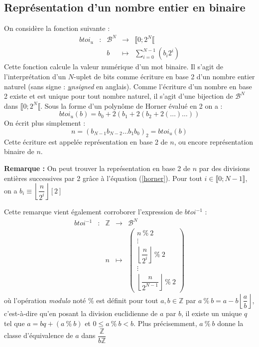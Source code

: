 \documentclass[../../main.tex]{subfiles}
\begin{document}
\subsection{Représentation d'un nombre entier en binaire}
On considère la fonction suivante :
$$
\begin{array}{lclcl}
btoi_{u} & : & \mathcal{B}^{N} & \rightarrow & \llbracket 0; 2^{N}\llbracket \\
     &   & b & \mapsto & \displaystyle\sum_{i = 0}^{N-1}(b_{i}2^{i})
\end{array}
$$
Cette fonction calcule la valeur numérique d'un mot binaire. Il s'agit de l'interprétation d'un $N$-uplet de bits comme écriture en base 2 d'un nombre entier naturel (sans signe : \textit{\underline{u}nsigned} en anglais). Comme l'écriture d'un nombre en base 2 existe et est unique pour tout nombre naturel, il s'agit d'une bijection de $\mathcal{B}^{N}$ dans $\llbracket 0; 2^{N}\llbracket $. \newline
Sous la forme d'un polynôme de Horner évalué en 2 on a :
\begin{equation}\label{horner}
btoi_{u}(b) = b_{0} + 2(b_{1} + 2(b_{2} + 2(\dots)\dots))
\end{equation}
On écrit plus simplement :
$$n = (b_{N-1}b_{N-2}\dots b_{1}b_{0})_{2} = btoi_{u}(b)$$
Cette écriture est appelée représentation en base 2 de $n$, ou encore représentation binaire de $n$.

\textbf{Remarque :} On peut trouver la représentation en base 2 de $n$ par des divisions entières successives par 2 grâce à l'équation (\ref{horner}). Pour tout $i\in{\llbracket{0; N-1}\rrbracket}$, on a $b_{i} \equiv{\left\lfloor{\dfrac{n}{2^{i}}}\right\rfloor{[2]}}$ 

Cette remarque vient également corroborer l'expression de $btoi^{-1}$ :
$$
\begin{array}{lclcl}
btoi^{-1} & : & \mathbb{Z} & \rightarrow & \mathcal{B}^{N} \\
     &   & n & \mapsto & \begin{pmatrix}
n\ \%\ 2 \\
\vdots \\
\left\lfloor\dfrac{n}{2^{i}}\right\rfloor\ \%\ 2 \\
\vdots \\
\left\lfloor\dfrac{n}{2^{N-1}}\right\rfloor\ \%\ 2
\end{pmatrix}
\end{array}
$$
où l'opération \textit{modulo} noté $\%$ est définit pour tout $a, b\in{\mathbb{Z}}$ par $a\ \%\ b = a - b\left\lfloor\dfrac{a}{b}\right\rfloor$, c'est-à-dire qu'en posant la division euclidienne de $a$ par $b$, il existe un unique $q$ tel que $a = bq + (a\ \%\ b)$ et $0 \leq a\ \%\ b < b$.\newline
Plus précisemment, $a\ \%\ b$ donne la classe d'équivalence de $a$ dans $\dfrac{\mathbb{Z}}{b\mathbb{Z}}$
\end{document}
